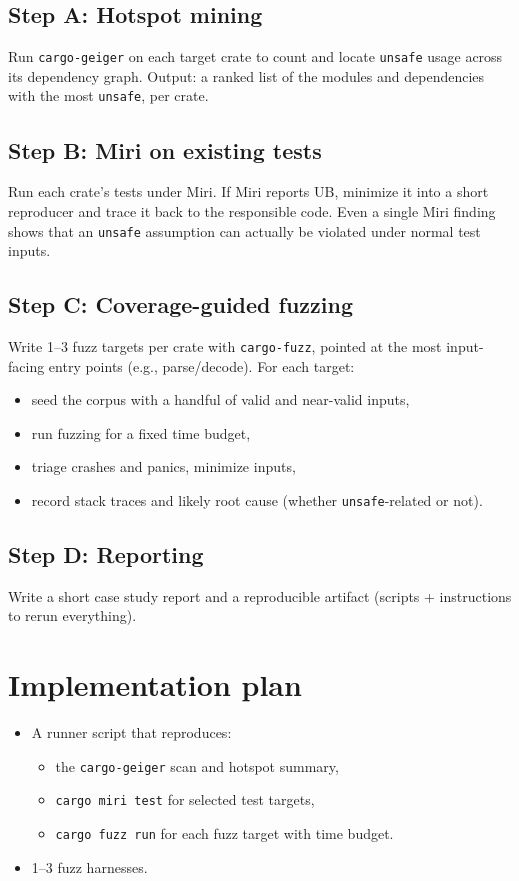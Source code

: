 \documentclass[11pt]{article}
\begin{document}
\subsection*{Step A: Hotspot mining}
Run \texttt{cargo-geiger} on each target crate to count and locate \texttt{unsafe} usage across its dependency graph. Output: a ranked list of the modules and dependencies with the most \texttt{unsafe}, per crate.

\subsection*{Step B: Miri on existing tests}
Run each crate's tests under Miri. If Miri reports UB, minimize it into a short reproducer and trace it back to the responsible code. Even a single Miri finding shows that an \texttt{unsafe} assumption can actually be violated under normal test inputs.

\subsection*{Step C: Coverage-guided fuzzing}
Write 1--3 fuzz targets per crate with \texttt{cargo-fuzz}, pointed at the most input-facing entry points (e.g., parse/decode). For each target:
\begin{itemize}[leftmargin=*]
  \item seed the corpus with a handful of valid and near-valid inputs,
  \item run fuzzing for a fixed time budget,
  \item triage crashes and panics, minimize inputs,
  \item record stack traces and likely root cause (whether \texttt{unsafe}-related or not).
\end{itemize}

\subsection*{Step D: Reporting}
Write a short case study report and a reproducible artifact (scripts + instructions to rerun everything).

\section*{Implementation plan}
\begin{itemize}[leftmargin=*]
  \item A runner script that reproduces:
  \begin{itemize}[leftmargin=1.2em]
    \item the \texttt{cargo-geiger} scan and hotspot summary,
    \item \texttt{cargo miri test} for selected test targets,
    \item \texttt{cargo fuzz run} for each fuzz target with time budget.
  \end{itemize}
  \item 1--3 fuzz harnesses.
\end{itemize}
\end{document}
